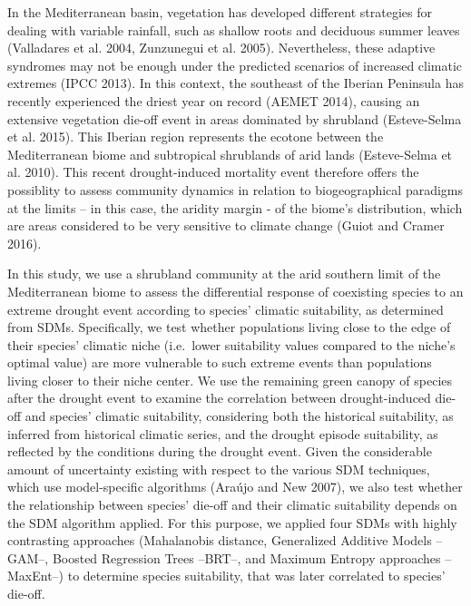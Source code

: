 \documentclass[11pt,twoside]{reedthesis}
\begin{document}
In the Mediterranean basin, vegetation has developed different
strategies for dealing with variable rainfall, such as shallow roots and
deciduous summer leaves (Valladares et al. 2004, Zunzunegui et al.
2005). Nevertheless, these adaptive syndromes may not be enough under
the predicted scenarios of increased climatic extremes (IPCC 2013). In
this context, the southeast of the Iberian Peninsula has recently
experienced the driest year on record (AEMET 2014), causing an extensive
vegetation die-off event in areas dominated by shrubland (Esteve-Selma
et al. 2015). This Iberian region represents the ecotone between the
Mediterranean biome and subtropical shrublands of arid lands
(Esteve-Selma et al. 2010). This recent drought-induced mortality event
therefore offers the possiblity to assess community dynamics in relation
to biogeographical paradigms at the limits -- in this case, the aridity
margin - of the biome's distribution, which are areas considered to be
very sensitive to climate change (Guiot and Cramer 2016).\par

In this study, we use a shrubland community at the arid southern limit
of the Mediterranean biome to assess the differential response of
coexisting species to an extreme drought event according to species'
climatic suitability, as determined from SDMs. Specifically, we test
whether populations living close to the edge of their species' climatic
niche (i.e.~lower suitability values compared to the niche's optimal
value) are more vulnerable to such extreme events than populations
living closer to their niche center. We use the remaining green canopy
of species after the drought event to examine the correlation between
drought-induced die-off and species' climatic suitability, considering
both the historical suitability, as inferred from historical climatic
series, and the drought episode suitability, as reflected by the
conditions during the drought event. Given the considerable amount of
uncertainty existing with respect to the various SDM techniques, which
use model-specific algorithms (Araújo and New 2007), we also test
whether the relationship between species' die-off and their climatic
suitability depends on the SDM algorithm applied. For this purpose, we
applied four SDMs with highly contrasting approaches (Mahalanobis
distance, Generalized Additive Models --GAM--, Boosted Regression Trees
--BRT--, and Maximum Entropy approaches --MaxEnt--) to determine species
suitability, that was later correlated to species' die-off.\par
\end{document}
